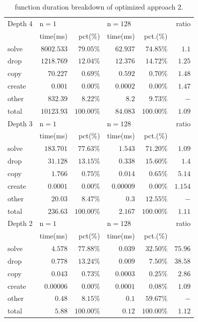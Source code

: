 \begin{table}
\begin{tabular}{|l|r|r|r|r|r|}
\hline Depth 4 & \multicolumn{2}{|l|}{$\mathrm{n}=1$} & \multicolumn{2}{|l|}{$\mathrm{n}=128$} & ratio \\
\cline { 2 - 5 } & \multicolumn{1}{|l|}{ time(ms) } & pct(\%) & time(ms) & pct.(\%) & \\
\hline solve & $8002.533$ & $79.05 \%$ & $62.937$ & $74.85 \%$ & $1.1$ \\
\hline drop & $1218.769$ & $12.04 \%$ & $12.376$ & $14.72 \%$ & $1.25$ \\
\hline copy & $70.227$ & $0.69 \%$ & $0.592$ & $0.70 \%$ & $1.48$ \\
\hline create & $0.001$ & $0.00 \%$ & $0.0002$ & $0.00 \%$ & $1.47$ \\
\hline other & $832.39$ & $8.22 \%$ & $8.2$ & $9.73 \%$ & $-$ \\
\hline total & $10123.93$ & $100.00 \%$ & $84.083$ & $100.00 \%$ & $1.09$ \\
\hline Depth 3 & \multicolumn{2}{|l|}{$\mathrm{n}=1$} & \multicolumn{2}{|l|}{$\mathrm{n}=128$} & ratio \\
\cline { 2 - 5 } & \multicolumn{1}{|l|}{ time(ms) } & pct(\%) & time(ms) & pct.(\%) & \\
\hline solve & $183.701$ & $77.63 \%$ & $1.543$ & $71.20 \%$ & $1.09$ \\
\hline drop & $31.128$ & $13.15 \%$ & $0.338$ & $15.60 \%$ & $1.4$ \\
\hline copy & $1.766$ & $0.75 \%$ & $0.014$ & $0.65 \%$ & $5.14$ \\
\hline create & $0.0001$ & $0.00 \%$ & $0.00009$ & $0.00 \%$ & $1.154$ \\
\hline other & $20.03$ & $8.47 \%$ & $0.3$ & $12.55 \%$ & $-$ \\
\hline total & $236.63$ & $100.00 \%$ & $2.167$ & $100.00 \%$ & $1.11$\\
\hline Depth 2& \multicolumn{2}{|l|}{$\mathrm{n}=1$} & \multicolumn{2}{|l|}{$\mathrm{n}=128$} & ratio \\
\cline { 2 - 5 } & \multicolumn{1}{|l|}{ time(ms) } & pct(\%) & time(ms) & pct.(\%) & \\
\hline solve & $4.578$ & $77.88 \%$ & $0.039$ & $32.50 \%$ & $75.96$ \\
\hline drop & $0.778$ & $13.24 \%$ & $0.009$ & $7.50 \%$ & $38.58$ \\
\hline copy & $0.043$ & $0.73 \%$ & $0.0003$ & $0.25 \%$ & $2.86$ \\
\hline create & $0.00006$ & $0.00 \%$ & $0.0001$ & $0.08 \%$ & $1.09$ \\
\hline other & $0.48$ & $8.15 \%$ & $0.1$ & $59.67 \%$ & $-$ \\
\hline total & $5.88$ & $100.00 \%$ & $0.12$ & $100.00 \%$ & $1.12$\\
\hline
\end{tabular}
\caption{function duration breakdown of optimized approach 2.}
\label{tab:function_duration_optimized}
\end{table}
